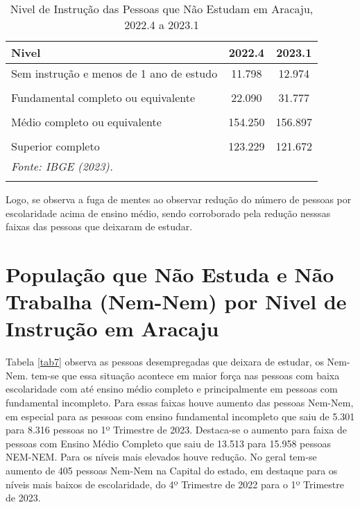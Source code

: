\documentclass[preprint, 3p,
authoryear]{elsarticle} %
\begin{document}
\begin{longtable}[t]{lcc}
\caption{\label{tab:tab6}\label{tab6}Nivel de Instrução das Pessoas que Não Estudam em Aracaju, 2022.4 a 2023.1}\\
\toprule
Nivel & 2022.4 & 2023.1\\
\midrule
Sem instrução e menos de 1 ano de estudo & 11.798 & 12.974\\
\cellcolor[HTML]{DCDCDC}{Fundamental incompleto ou equivalente} & \cellcolor[HTML]{DCDCDC}{94.121} & \cellcolor[HTML]{DCDCDC}{92.719}\\
Fundamental completo ou equivalente & 22.090 & 31.777\\
\cellcolor[HTML]{DCDCDC}{Médio incompleto ou equivalente} & \cellcolor[HTML]{DCDCDC}{26.680} & \cellcolor[HTML]{DCDCDC}{26.442}\\
Médio completo ou equivalente & 154.250 & 156.897\\
\addlinespace
\cellcolor[HTML]{DCDCDC}{Superior incompleto ou equivalente} & \cellcolor[HTML]{DCDCDC}{19.829} & \cellcolor[HTML]{DCDCDC}{17.383}\\
Superior completo & 123.229 & 121.672\\
\bottomrule
\multicolumn{3}{l}{\rule{0pt}{1em}\textit{Fonte: IBGE (2023).}}\\
\multicolumn{3}{l}{\rule{0pt}{1em}}\\
\end{longtable}
\endgroup{}

Logo, se observa a fuga de mentes ao observar redução do número de
pessoas por escolaridade acima de ensino médio, sendo corroborado pela
redução nesssas faixas das pessoas que deixaram de estudar.

\hypertarget{populauxe7uxe3o-que-nuxe3o-estuda-e-nuxe3o-trabalha-nem-nem-por-nivel-de-instruuxe7uxe3o-em-aracaju}{%
\section{População que Não Estuda e Não Trabalha (Nem-Nem) por Nivel de
Instrução em
Aracaju}\label{populauxe7uxe3o-que-nuxe3o-estuda-e-nuxe3o-trabalha-nem-nem-por-nivel-de-instruuxe7uxe3o-em-aracaju}}

Tabela \ref{tab7} observa as pessoas desempregadas que deixara de
estudar, os Nem-Nem. tem-se que essa situação acontece em maior força
nas pessoas com baixa escolaridade com até ensino médio completo e
principalmente em pessoas com fundamental incompleto. Para essas faixas
houve aumento das pessoas Nem-Nem, em especial para as pessoas com
ensino fundamental incompleto que saiu de 5.301 para 8.316 pessoas no 1º
Trimestre de 2023. Destaca-se o aumento para faixa de pessoas com Ensino
Médio Completo que saiu de 13.513 para 15.958 pessoas NEM-NEM. Para os
níveis mais elevados houve redução. No geral tem-se aumento de 405
pessoas Nem-Nem na Capital do estado, em destaque para os níveis mais
baixos de escolaridade, do 4º Trimestre de 2022 para o 1º Trimestre de
2023.
\end{document}

